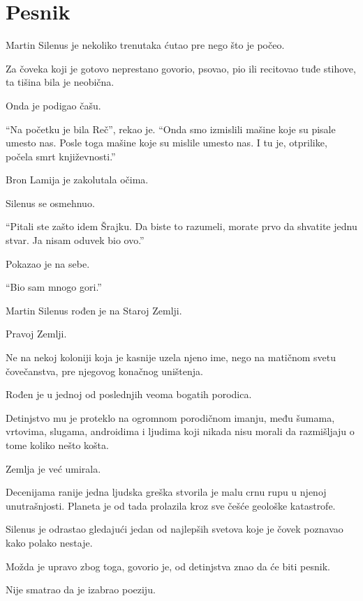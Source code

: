 \chapter{Pesnik}


Martin Silenus je nekoliko trenutaka ćutao pre nego što je počeo.

Za čoveka koji je gotovo neprestano govorio, psovao, pio ili recitovao tuđe stihove, ta tišina bila je neobična.

Onda je podigao čašu.

``Na početku je bila Reč'', rekao je. ``Onda smo izmislili mašine koje su pisale umesto nas. Posle toga mašine koje su mislile umesto nas. I tu je, otprilike, počela smrt književnosti.''

Bron Lamija je zakolutala očima.

Silenus se osmehnuo.

``Pitali ste zašto idem Šrajku. Da biste to razumeli, morate prvo da shvatite jednu stvar. Ja nisam oduvek bio ovo.''

Pokazao je na sebe.

``Bio sam mnogo gori.''

\bigskip

Martin Silenus rođen je na Staroj Zemlji.

Pravoj Zemlji.

Ne na nekoj koloniji koja je kasnije uzela njeno ime, nego na matičnom svetu čovečanstva, pre njegovog konačnog uništenja.

Rođen je u jednoj od poslednjih veoma bogatih porodica.

Detinjstvo mu je proteklo na ogromnom porodičnom imanju, među šumama, vrtovima, slugama, androidima i ljudima koji nikada nisu morali da razmišljaju o tome koliko nešto košta.

Zemlja je već umirala.

Decenijama ranije jedna ljudska greška stvorila je malu crnu rupu u njenoj unutrašnjosti. Planeta je od tada prolazila kroz sve češće geološke katastrofe.

Silenus je odrastao gledajući jedan od najlepših svetova koje je čovek poznavao kako polako nestaje.

Možda je upravo zbog toga, govorio je, od detinjstva znao da će biti pesnik.

Nije smatrao da je izabrao poeziju.

